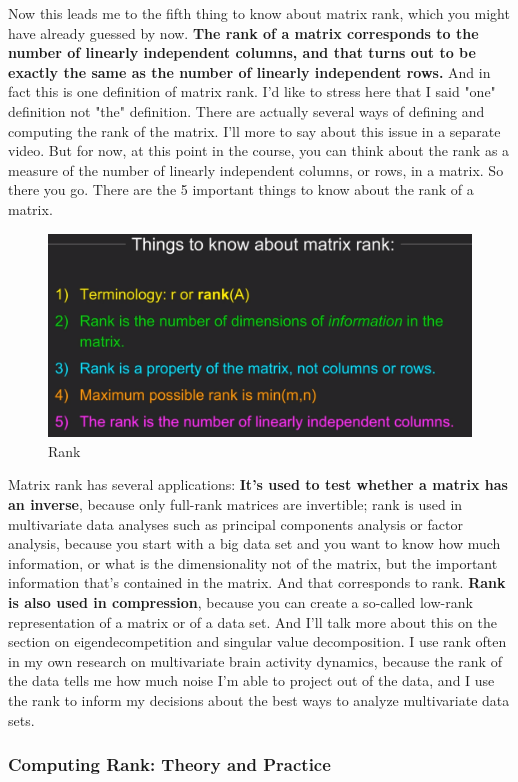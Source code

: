 \documentclass[fleqn,10pt]{olplainarticle}
\theoremstyle{definition}
\theoremstyle{remark}
\begin{document}
Now this leads me to the fifth thing to know about matrix rank, which you might have already guessed by now. \textbf{The rank of a matrix corresponds to the number of linearly independent columns, and that turns out to be exactly the same as the number of linearly independent rows.} And in fact this is one definition of matrix rank. I'd like to stress here that I said "one" definition not "the" definition. There are actually several ways of defining and computing the rank of the matrix. I'll more to say about this issue in a separate video. But for now, at this point in the course, you can think about the rank as a measure of the number of linearly independent columns, or rows, in a matrix. So there you go. There are the 5 important things to know about the rank of a matrix. 

\begin{figure}[ht]
	\centering
	\includegraphics[width=0.4\linewidth]{images/rank-12.png}
	\caption{Rank}
	\label{fig:rank_12}
\end{figure}

Matrix rank has several applications: \textbf{It's used to test whether a matrix has an inverse}, because only full-rank matrices are invertible; rank is used in multivariate data analyses such as principal components analysis or factor analysis, because you start with a big data set and you want to know how much information, or what is the dimensionality not of the matrix, but the important information that's contained in the matrix. And that corresponds to rank.  \textbf{Rank is also used in compression}, because you can create a so-called low-rank representation of a matrix or of a data set. And I'll talk more about this on the section on eigendecompetition and singular value decomposition. I use rank often in my own research on multivariate brain activity dynamics, because the rank of the data tells me how much noise I'm able to project out of the data, and I use the rank to inform my decisions about the best ways to analyze multivariate data sets.

\pagebreak

\subsubsection*{Computing Rank: Theory and Practice}
\end{document}
